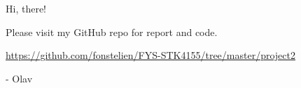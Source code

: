\documentclass[]{article}
\begin{document}
Hi, there!
\vspace{5mm}

Please visit my GitHub repo for report and code.

\vspace{5mm}

\url{https://github.com/fonstelien/FYS-STK4155/tree/master/project2}


\vspace{12mm}

- Olav
\end{document}
